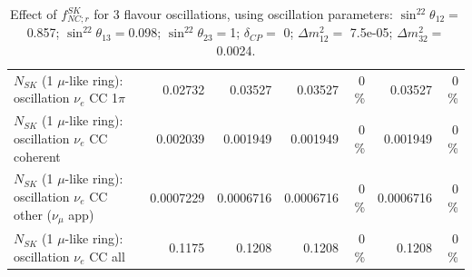 \begin{table}
\begin{tabular}{| l | r | r | r  r | r  r |}
                     $N_{SK}$ (1 $\mu$-like ring): oscillation $\nu_e$ CC 1$\pi$ &         0.02732 &         0.03527 &         0.03527 &        0 \%  &         0.03527 &        0 \%  \\ 
                   $N_{SK}$ (1 $\mu$-like ring): oscillation $\nu_e$ CC coherent &        0.002039 &        0.001949 &        0.001949 &        0 \%  &        0.001949 &        0 \%  \\ 
      $N_{SK}$ (1 $\mu$-like ring): oscillation $\nu_e$ CC other ($\nu_\mu$ app) &       0.0007229 &       0.0006716 &       0.0006716 &        0 \%  &       0.0006716 &        0 \%  \\ 
                       $N_{SK}$ (1 $\mu$-like ring): oscillation $\nu_e$  CC all &          0.1175 &          0.1208 &          0.1208 &        0 \%  &          0.1208 &        0 \%  \\ 
\hline
\hline
\end{tabular}
\caption{ Effect of $f_{NC; r}^{SK}$ for 3 flavour oscillations, using oscillation parameters:  $\sin^22\theta_{12} = $0.857; $\sin^22\theta_{13} = $0.098; $\sin^22\theta_{23} = $1; $\delta_{CP} = $        0; $\Delta m^2_{12} = $    7.5e-05; $\Delta m^2_{32} = $    0.0024. }
\label{tab:num_sk_1Rmu_nc_eff_1RmuT_3f_osc_t13:0.098}
\end{table}
\clearpage

